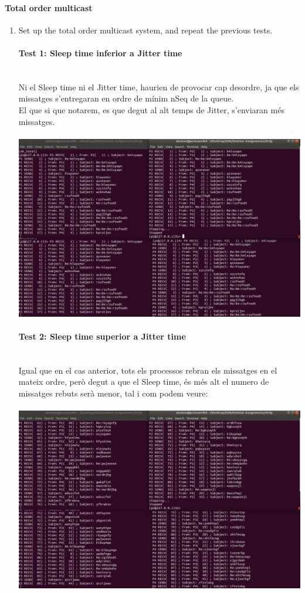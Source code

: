 \documentclass[a4paper, 10pt]{article}
\begin{document}
\newpage\paragraph[bold]{Total order multicast}
\begin{enumerate}
\item  Set up the total order multicast system, and repeat the previous tests.
\paragraph[bold]{Test 1: Sleep time inferior a Jitter time\\\\}
Ni el Sleep time ni el Jitter time, haurien de provocar cap desordre, ja que els missatges s'entregaran en ordre de mínim nSeq de la queue.\\
El que si que notarem, es que degut al alt temps de Jitter, s'enviaran més missatges.\\\\
\includegraphics[width=\textwidth]{ordy-total-1}
\newpage\paragraph[bold]{Test 2: Sleep time superior a Jitter time\\\\}
Igual que en el cas anterior, tots els processos rebran els missatges en el mateix ordre, però degut a que el Sleep time, és més alt el numero de missatges rebuts serà menor, tal i com podem veure:\\\\
\includegraphics[width=\textwidth]{ordy-total-2}

\end{enumerate}
\end{document}
